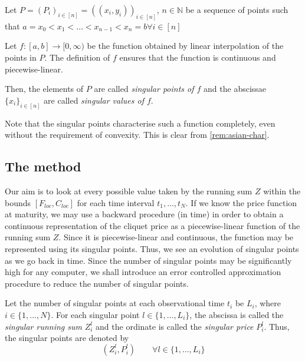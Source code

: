 \begin{dfn}
	\label{def:clq-sp}
	Let $ P = (P_i)_{i \in [n]} = ( (x_i, y_i) )_{i \in [n]} $, $ n \in \mathbb{N} $ be a sequence of points such that $ a = x_0 < x_1 < \dots < x_{n-1} < x_n = b \forall i \in [n] $
	
	Let $ f:[a,b] \to [0, \infty) $ be the function obtained by linear interpolation of the points in $P$. The definition of $f$ ensures that the function is continuous and piecewise-linear.
	
	Then, the elements of $P$ are called \emph{singular points of $f$} and the abscissae $ \{ x_i \}_{i \in [n]} $ are called \emph{singular values of $f$}.
\end{dfn}


\begin{rem}[characterisation]
	\label{rem:clq-char}
	Note that the singular points characterise such a function completely, even without the requirement of convexity. This is clear from \ref{rem:asian-char}.
\end{rem}


\subsection{The method}
\label{subsec:clq-method}

Our aim is to look at every possible value taken by the running sum $Z$ within the bounds $ [ F_{loc}, C_{loc} ] $ for each time interval $ t_1, \dots, t_{N} $. If we know the price function at maturity, we may use a backward procedure (in time) in order to obtain a continuous representation of the cliquet price as a piecewise-linear function of the running sum $Z$. Since it is piecewise-linear and continuous, the function may be represented using its singular points. Thus, we see an evolution of singular points as we go back in time. Since the number of singular points may be significantly high for any computer, we shall introduce an error controlled approximation procedure to reduce the number of singular points.

Let the number of singular points at each observational time $ t_i $ be $ L_{i} $, where $ i \in \{ 1, \dots, N \} $. For each singular point $ l \in \{ 1, \dots, L_i \} $, the abscissa is called the \emph{singular running sum} $ Z_i^l $ and the ordinate is called the \emph{singular price} $ P_i^l $. Thus, the singular points are denoted by
\begin{equation*}
	( Z_i^l, P_i^l ) \qquad \forall l \in \{ 1, \dots, L_i \}
\end{equation*}


